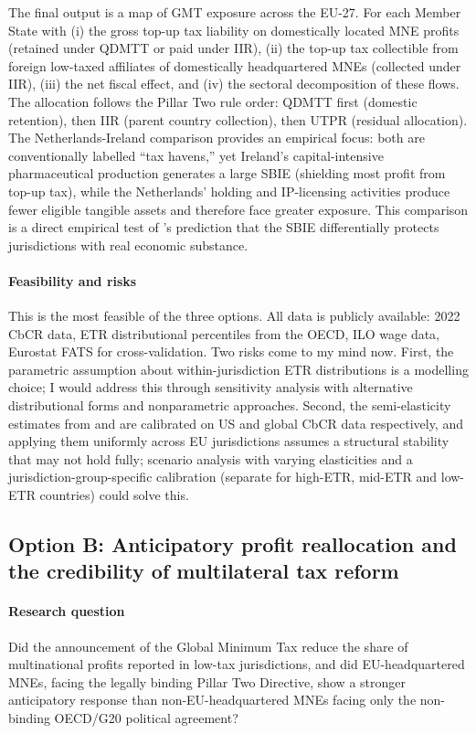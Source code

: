 \documentclass[11pt,a4paper]{article}
\begin{document}
The final output is a map of GMT exposure across the EU-27. For each Member State with (i) the gross top-up tax liability on domestically located MNE profits (retained under QDMTT or paid under IIR), (ii) the top-up tax collectible from foreign low-taxed affiliates of domestically headquartered MNEs (collected under IIR), (iii) the net fiscal effect, and (iv) the sectoral decomposition of these flows. The allocation follows the Pillar Two rule order: QDMTT first (domestic retention), then IIR (parent country collection), then UTPR (residual allocation). The Netherlands-Ireland comparison provides an empirical focus: both are conventionally labelled ``tax havens,'' yet Ireland's capital-intensive pharmaceutical production generates a large SBIE (shielding most profit from top-up tax), while the Netherlands' holding and IP-licensing activities produce fewer eligible tangible assets and therefore face greater exposure. This comparison is a direct empirical test of \citeauthor{schjelderup2024}'s prediction that the SBIE differentially protects jurisdictions with real economic substance.

\paragraph{Feasibility and risks} This is the most feasible of the three options. All data is publicly available: 2022 CbCR data, ETR distributional percentiles from the OECD, ILO wage data, Eurostat FATS for cross-validation. Two risks come to my mind now. First, the parametric assumption about within-jurisdiction ETR distributions is a modelling choice; I would address this through sensitivity analysis with alternative distributional forms and nonparametric approaches. Second, the semi-elasticity estimates from \citeauthor{dowd2017} and \citeauthor{garcia2024} are calibrated on US and global CbCR data respectively, and applying them uniformly across EU jurisdictions assumes a structural stability that may not hold fully; scenario analysis with varying elasticities and a jurisdiction-group-specific calibration (separate for high-ETR, mid-ETR and low-ETR countries) could solve this. 

\subsection{Option B: Anticipatory profit reallocation and the credibility of multilateral tax reform}\label{sec:optionB}

\paragraph{Research question} Did the announcement of the Global Minimum Tax reduce the share of multinational profits reported in low-tax jurisdictions, and did EU-headquartered MNEs, facing the legally binding Pillar Two Directive, show a stronger anticipatory response than non-EU-headquartered MNEs facing only the non-binding OECD/G20 political agreement?
\end{document}
